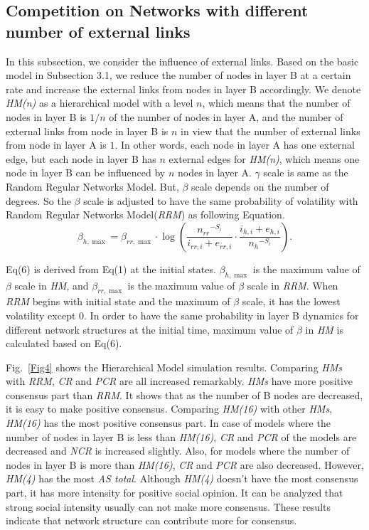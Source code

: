 \documentclass[english]{cccconf}
\begin{document}
\subsection{Competition on Networks with different number of external links}

In this subsection, we consider the influence of external links. Based on the basic model in Subsection 3.1, we reduce the number of nodes in layer B at a certain rate and increase the external links from nodes in layer B accordingly.  We denote \textit{HM(n)} as a hierarchical model with a level $n$, which means that the number of nodes in layer B is $1/n$ of the number of nodes in layer A, and the number of external links from node in layer B is $n$ in view that the number of external links from node in layer A is $1$. In other words, each node in layer A has one external edge, but each node in layer B has $n$ external edges for \textit{HM(n)}, which means one node in layer B can be influenced by $n$ nodes in layer A. $\gamma$ scale is same as the Random Regular Networks Model. But, $\beta$ scale depends on the number of degrees. So the $\beta$ scale is adjusted to have the same probability of volatility with Random Regular Networks Model(\textit{RRM}) as following Equation.
\begin{equation}
{\beta _{h,\max}} = {\beta _{rr,\max}} \cdot \log \left( {\frac{{{n_{rr}}^{ - {S_i}}}}{{{i_{rr,i}} + {e_{rr,i}}}} \cdot \frac{{{i_{h,i}} + {e_{h,i}}}}{{{n_{h}}^{ - {S_i}}}}} \right). 
\end{equation}

Eq(6) is derived from Eq(1) at the initial states. $\beta _{h,\max}$ is the maximum value of $\beta$ scale in \textit{HM}, and $\beta _{rr,\max}$ is the maximum value of $\beta$ scale in \textit{RRM}. When \textit{RRM} begins with initial state and the maximum of $\beta$ scale, it has the lowest volatility except $0$. In order to have the same probability in layer B dynamics for different network structures at the initial time, maximum value of $\beta$ in \textit{HM} is calculated based on Eq(6). 

Fig.~\ref{Fig4} shows the Hierarchical Model simulation results. Comparing \textit{HMs} with \textit{RRM}, \textit{CR} and \textit{PCR} are all increased remarkably. \textit{HMs} have more positive consensus part than \textit{RRM}. It shows that as the number of B nodes are decreased, it is easy to make positive consensus. Comparing \textit{HM(16)} with other \textit{HMs}, \textit{HM(16)} has the most positive consensus part. In case of models where the number of nodes in layer B is less than \textit{HM(16)},  \textit{CR} and \textit{PCR} of the models are decreased and \textit{NCR} is increased slightly. Also, for models where the number of nodes in layer B is more than \textit{HM(16)}, \textit{CR} and \textit{PCR} are also decreased. However, \textit{HM(4)} has the most \textit{AS total}. Although \textit{HM(4)} doesn't have the most consensus part, it has more intensity for positive social opinion. It can be analyzed that strong social intensity usually can not make more consensus. These results indicate that network structure can contribute more for consensus. 
   
\end{document}
